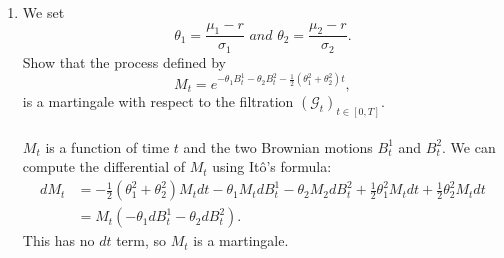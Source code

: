\documentclass[handout,8pt]{beamer}
\begin{document}
\begin{frame}[allowframebreaks]{ }
\begin{enumerate}
    \begin{enumerate}
        \item We set
        \begin{equation*}
            \theta_1=\frac{\mu_1 - r}{\sigma_1} \textit{ and } \theta_2=\frac{\mu_2 - r}{\sigma_2}.
        \end{equation*}
        Show that the process defined by
        \begin{equation*}
            M_t=e^{-\theta_1 B_t^1 -\theta_2 B_t^2 -\frac{1}{2}(\theta_1^2+\theta_2^2)t},
        \end{equation*}
        is a martingale with respect to the filtration $(\mathcal{G}_t)_{t\in[0, T]}$.\\\\
        $M_t$ is a function of time $t$ and the two Brownian motions $B_t^1$ and $B_t^2$. We can compute the differential of $M_t$ using Itô's formula:
        \begin{align*}
            dM_t &= -\frac{1}{2}(\theta_1^2 +\theta_2^2)M_t dt - \theta_1M_t dB_t^1 - \theta_2M_2dB_t^2 +\frac{1}{2}\theta_1^2M_t dt + \frac{1}{2}\theta_2^2M_t dt \\
            &= M_t(-\theta_1 dB_t^1 -\theta_2 dB_t^2).
        \end{align*}
        This has no $dt$ term, so $M_t$ is a martingale.
        

\end{enumerate}
\end{enumerate}
\end{frame}
\end{document}
